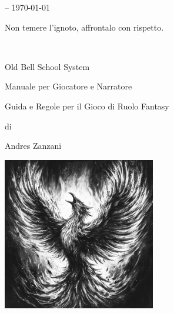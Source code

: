 \vfill

\begin{center}\textbf{\versione} -- \today\end{center}

\vspace{1cm}

\begin{changemargin}{0.3cm}{0.3cm}\begin{tcolorbox}
\begin{center}
Non temere l'ignoto, affrontalo con rispetto.
\end{center}
\end{tcolorbox}\end{changemargin}

\thispagestyle{empty}

\newpage~\thispagestyle{empty}%

\pagebreak

{\Huge \begin{center} Old Bell School System \end{center}}

\bigskip

\begin{center}{\LARGE Manuale per Giocatore e Narratore}\\ \end{center}

{\large \begin{center} Guida e Regole per il Gioco di Ruolo Fantasy \end{center}}

\begin{center}di \end{center}

{\LARGE \begin{center} Andres Zanzani \end{center}}

\vspace{2cm}

\begin{center}
\includegraphics[keepaspectratio,width=0.50\textwidth]{immagini/phoenix-ai.png}
\end{center}


